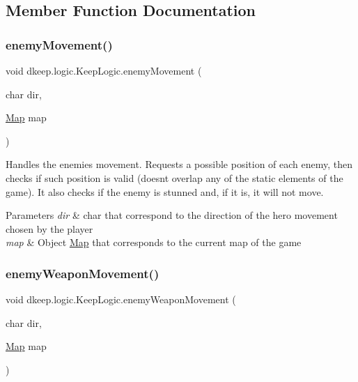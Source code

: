 \subsection{Member Function Documentation}
\mbox{\label{classdkeep_1_1logic_1_1_keep_logic_a591c644d50fb74047689ee7f23e4e9e0}} 
\subsubsection{\texorpdfstring{enemy\+Movement()}{enemyMovement()}}
{\footnotesize\ttfamily void dkeep.\+logic.\+Keep\+Logic.\+enemy\+Movement (\begin{DoxyParamCaption}\item[{char}]{dir,  }\item[{\hyperlink{classdkeep_1_1logic_1_1_map}{Map}}]{map }\end{DoxyParamCaption})}

Handles the enemies movement. Requests a possible position of each enemy, then checks if such position is valid (doesn\textquotesingle{}t overlap any of the static elements of the game). It also checks if the enemy is stunned and, if it is, it will not move. 
\begin{DoxyParams}{Parameters}
{\em dir} & char that correspond to the direction of the hero movement chosen by the player \\
\hline
{\em map} & Object \hyperlink{classdkeep_1_1logic_1_1_map}{Map} that corresponds to the current map of the game \\
\hline
\end{DoxyParams}
\mbox{\label{classdkeep_1_1logic_1_1_keep_logic_a02e0e445c71a2d460eea461ed8aadb67}} 
\subsubsection{\texorpdfstring{enemy\+Weapon\+Movement()}{enemyWeaponMovement()}}
{\footnotesize\ttfamily void dkeep.\+logic.\+Keep\+Logic.\+enemy\+Weapon\+Movement (\begin{DoxyParamCaption}\item[{char}]{dir,  }\item[{\hyperlink{classdkeep_1_1logic_1_1_map}{Map}}]{map }\end{DoxyParamCaption})}

